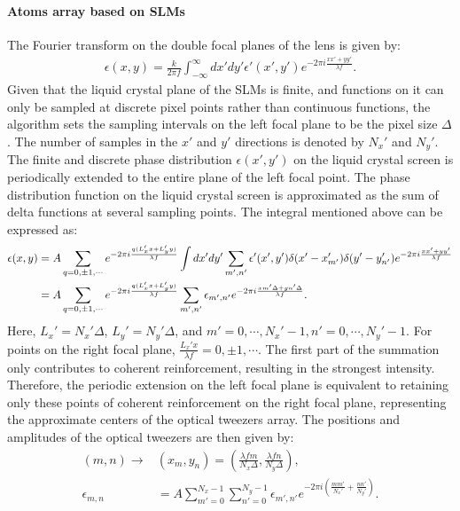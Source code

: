 \documentclass[11pt]{article}
\begin{document}
\paragraph{Atoms array based on SLMs}
The Fourier transform on the double focal planes of the lens is given by:
\begin{align}
    \epsilon(x,y) =  \frac{k}{2\pi f} \int_{-\infty}^{\infty} dx' dy' \epsilon'(x',y') e^{-2\pi i \frac{xx'+yy'}{\lambda f}}.
 \end{align}
 Given that the liquid crystal plane of the SLMs is finite, and functions on it can only be sampled at discrete pixel points rather than continuous functions, the algorithm sets the sampling intervals on the left focal plane to be the pixel size $\Delta$. The number of samples in the $x'$ and $y'$ directions is denoted by $N_x'$ and $N_y'$. The finite and discrete phase distribution $\epsilon(x',y')$ on the liquid crystal screen is periodically extended to the entire plane of the left focal point. The phase distribution function on the liquid crystal screen is approximated as the sum of delta functions at several sampling points. The integral mentioned above can be expressed as:
  \begin{align}
    \epsilon(x,y) &=  A\sum_{q=0,\pm 1,\cdots}  e^{-2\pi i \frac{q(L_x' x+L_y' y)}{\lambda f}} \int dx' dy' \sum_{m',n'}  \epsilon'(x',y')\delta(x' - x'_{m'})\delta(y' - y'_{n'}) e^{-2\pi i \frac{xx'+yy'}{\lambda f}} \notag \\
    &= A\sum_{q=0,\pm 1,\cdots} e^{-2\pi i \frac{q(L_x' x+L_y' y)}{\lambda f}}  \sum_{m',n'} \epsilon_{m',n'} e^{-2\pi i \frac{x m' \Delta +y n' \Delta }{\lambda f}}.
 \end{align}
Here, $L_x' = N_x' \Delta$, $L_y' = N_y' \Delta$, and $m'= 0,\cdots, N_x'-1, n'= 0, \cdots, N_y' -1$. For points on the right focal plane, $\frac{L_x' x}{\lambda f} = 0, \pm 1, \cdots$. The first part of the summation only contributes to coherent reinforcement, resulting in the strongest intensity. Therefore, the periodic extension on the left focal plane is equivalent to retaining only these points of coherent reinforcement on the right focal plane, representing the approximate centers of the optical tweezers array. The positions and amplitudes of the optical tweezers are then given by:
 \begin{align}
     (m,n) \to& (x_m,y_n) = (\frac{\lambda f m}{N_x \Delta}, \frac{\lambda f n}{N_y \Delta}), \\
     \epsilon_{m,n} &= A \sum_{m' = 0}^{N_x -1}\sum_{n' = 0}^{N_y -1} \epsilon_{m',n'} e^{-2\pi i (\frac{m m' }{N_x'} +\frac{n n' }{N_y'})}.
 \end{align}
\end{document}
